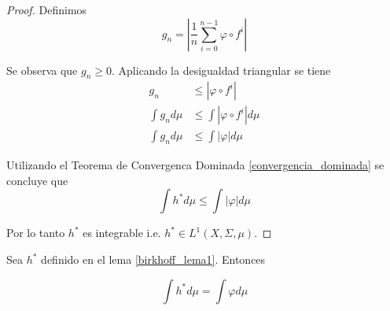 \begin{proof}
	Definimos
	\begin{equation}
		g_n = \left| \frac{1}{n} \sum_{i=0}^{n-1} \varphi \circ f^i \right|
	\end{equation}
	
	Se observa que $g_n \geq 0$. Aplicando la desigualdad triangular se tiene
	\begin{align}
		g_n &\leq |\varphi \circ f^i|\\		
		\int g_n d\mu &\leq \int |\varphi \circ f^i| d\mu\\
		\int g_n d\mu &\leq \int |\varphi| d\mu
	\end{align}
	
	Utilizando el Teorema de Convergenca Dominada \ref{convergencia_dominada} se concluye que
	\begin{equation}
		\int h^* d\mu \leq \int |\varphi| d\mu
	\end{equation}
	
	Por lo tanto $h^*$ es integrable i.e. $h^* \in L^1(X,\Sigma,\mu)$.
\end{proof}

\begin{lema}\label{birkhoff_lema3}
	Sea $h^*$  definido en el lema \ref{birkhoff_lema1}. Entonces
	
	\begin{equation}
		\int h^* d\mu = \int \varphi d\mu
	\end{equation}
\end{lema}


